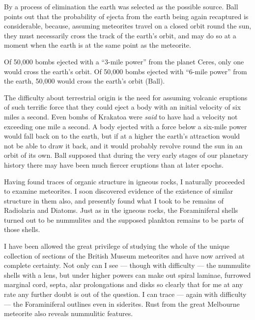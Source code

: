\documentclass[a4paper, 12pt, oneside]{article}
\begin{document}
By a process of elimination the earth was selected as the possible source. Ball points out that the probability of ejecta from the earth being again recaptured is considerable, because, assuming meteorites travel on a closed orbit round the sun, they must necessarily cross the track of the earth's orbit, and may do so at a moment when the earth is at the same point as the meteorite.

Of 50,000 bombs ejected with a ``3-mile power'' from the planet Ceres, only one would cross the earth's orbit. Of 50,000 bombs ejected with ``6-mile power'' from the earth, 50,000 would cross the earth's orbit (Ball).

The difficulty about terrestrial origin is the need for assuming volcanic eruptions of such terrific force that they could eject a body with an initial velocity of six miles a second. Even bombs of Krakatoa were \emph{said} to have had a velocity not exceeding one mile a second. A body ejected with a force below a six-mile power would fall back on to the earth, but if at a higher the earth's attraction would not be able to draw it back, and it would probably revolve round the sun in an orbit of its own. Ball supposed that during the very early stages of our planetary history there may have been much fiercer eruptions than at later epochs.

Having found traces of organic structure in igneous rocks, I naturally proceeded to examine meteorites. I soon discovered evidence of the existence of similar structure in them also, and presently found what I took to be remains of Radiolaria and Diatoms. Just as in the igneous rocks, the Foraminiferal shells turned out to be nummulites and the supposed plankton remains to be parts of those shells.

I have been allowed the great privilege of studying the whole of the unique collection of sections of the British Museum meteorites and have now arrived at complete certainty. Not only can I see --- though with difficulty --- the nummulite shells with a lens, but under higher powers can make out spiral laminae, furrowed marginal cord, septa, alar prolongations and disks so clearly that for me at any rate any further doubt is out of the question. I can trace --- again with difficulty --- the Foraminiferal outlines even in siderites. Rust from the great Melbourne meteorite also reveals nummulitic features.
\end{document}
